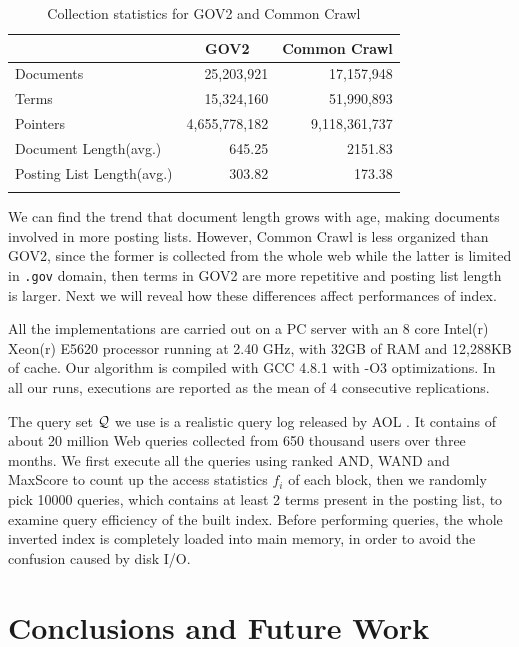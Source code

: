 \documentclass{sig-alternate-05-2015}
\begin{document}
\begin{table}
	\centering
	\caption{Collection statistics for GOV2 and Common Crawl}
	\renewcommand{\arraystretch}{1.0}
	\begin{tabular}{l*{2}{r}}
		\toprule
		& \multicolumn{1}{c}{GOV2} & \multicolumn{1}{c}{Common Crawl} \\
		\midrule
		Documents & 25,203,921 & 17,157,948 \\
		Terms  & 15,324,160 & 51,990,893 \\
		Pointers & 4,655,778,182 & 9,118,361,737 \\
		Document Length(avg.) & 645.25 & 2151.83 \\
		Posting List Length(avg.) & 303.82 & 173.38 \\
		\bottomrule
		\label{tab: collection statistics}
	\end{tabular}
\end{table}

We can find the trend that document length grows with age, making documents involved in more posting lists.
However, Common Crawl is less organized than GOV2, since the former is collected from the whole web while the latter is limited in \texttt{.gov} domain, then terms in GOV2 are more repetitive and posting list length is larger.
Next we will reveal how these differences affect performances of index.

All the implementations are carried out on a PC server with an 8 core Intel(r) Xeon(r) E5620 processor running at 2.40 GHz, with 32GB of RAM and 12,288KB of cache. Our algorithm is compiled with GCC 4.8.1 with -O3 optimizations. In all our runs, executions are reported as the mean of 4 consecutive replications.

The query set $ \cal Q $ we use is a realistic query log released by AOL \cite{pass2006picture}.
It contains of about 20 million Web queries collected from 650 thousand users over three months.
We first execute all the queries using ranked AND, WAND and MaxScore to count up the access statistics $ f_i $ of each block, then we randomly pick 10000 queries, which contains at least 2 terms present in the posting list, to examine query efficiency of the built index.
Before performing queries, the whole inverted index is completely loaded into main memory, in order to avoid the confusion caused by disk I/O.


\section{Conclusions and Future Work}
\end{document}
